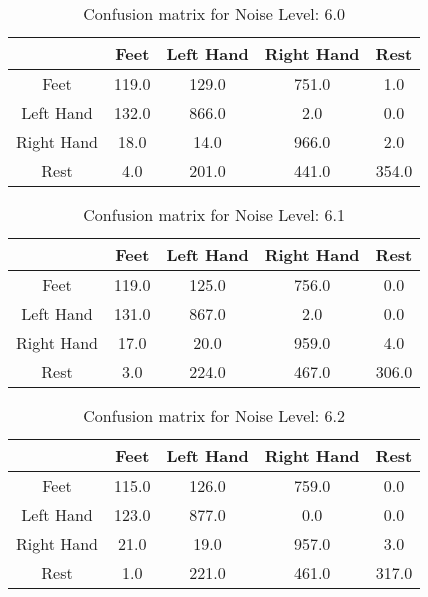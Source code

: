 \begin{table}[!htbp]
    \centering
    \begin{tabular}{|c||c|c|c|c|}
        \hline
		 & Feet & Left Hand & Right Hand & Rest \\
        \hline
        \hline
        Feet & 119.0 & 129.0 & 751.0 & 1.0 \\
        \hline
        Left Hand & 132.0 & 866.0 & 2.0 & 0.0 \\
        \hline
        Right Hand & 18.0 & 14.0 & 966.0 & 2.0 \\
        \hline
        Rest & 4.0 & 201.0 & 441.0 & 354.0 \\
        \hline
    \end{tabular}
    \caption{Confusion matrix for Noise Level: 6.0}
\end{table}

\begin{table}[!htbp]
    \centering
    \begin{tabular}{|c||c|c|c|c|}
        \hline
		 & Feet & Left Hand & Right Hand & Rest \\
        \hline
        \hline
        Feet & 119.0 & 125.0 & 756.0 & 0.0 \\
        \hline
        Left Hand & 131.0 & 867.0 & 2.0 & 0.0 \\
        \hline
        Right Hand & 17.0 & 20.0 & 959.0 & 4.0 \\
        \hline
        Rest & 3.0 & 224.0 & 467.0 & 306.0 \\
        \hline
    \end{tabular}
    \caption{Confusion matrix for Noise Level: 6.1}
\end{table}

\begin{table}[!htbp]
    \centering
    \begin{tabular}{|c||c|c|c|c|}
        \hline
		 & Feet & Left Hand & Right Hand & Rest \\
        \hline
        \hline
        Feet & 115.0 & 126.0 & 759.0 & 0.0 \\
        \hline
        Left Hand & 123.0 & 877.0 & 0.0 & 0.0 \\
        \hline
        Right Hand & 21.0 & 19.0 & 957.0 & 3.0 \\
        \hline
        Rest & 1.0 & 221.0 & 461.0 & 317.0 \\
        \hline
    \end{tabular}
    \caption{Confusion matrix for Noise Level: 6.2}
\end{table}

